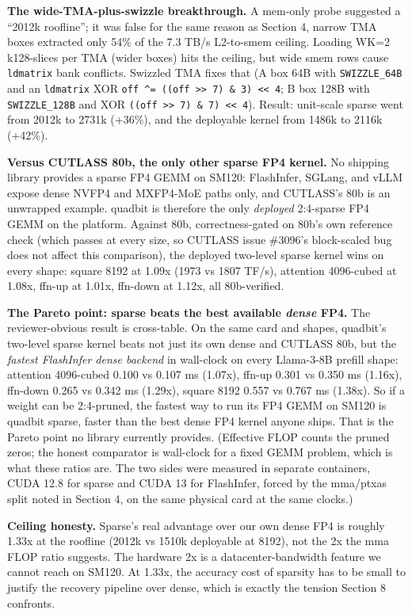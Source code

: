 \documentclass[
]{article}
\begin{document}
\textbf{The wide-TMA-plus-swizzle breakthrough.} A mem-only probe
suggested a ``2012k roofline''; it was false for the same reason as
Section 4, narrow TMA boxes extracted only 54\% of the 7.3 TB/s
L2-to-smem ceiling. Loading WK=2 k128-slices per TMA (wider boxes) hits
the ceiling, but wide smem rows cause \texttt{ldmatrix} bank conflicts.
Swizzled TMA fixes that (A box 64B with \texttt{SWIZZLE\_64B} and an
\texttt{ldmatrix} XOR
\texttt{off\ \^{}=\ ((off\ \textgreater{}\textgreater{}\ 7)\ \&\ 3)\ \textless{}\textless{}\ 4};
B box 128B with \texttt{SWIZZLE\_128B} and XOR
\texttt{((off\ \textgreater{}\textgreater{}\ 7)\ \&\ 7)\ \textless{}\textless{}\ 4}).
Result: unit-scale sparse went from 2012k to 2731k (+36\%), and the
deployable kernel from 1486k to 2116k (+42\%).

\textbf{Versus CUTLASS 80b, the only other sparse FP4 kernel.} No
shipping library provides a sparse FP4 GEMM on SM120: FlashInfer,
SGLang, and vLLM expose dense NVFP4 and MXFP4-MoE paths only, and
CUTLASS's 80b is an unwrapped example. quadbit is therefore the only
\emph{deployed} 2:4-sparse FP4 GEMM on the platform. Against 80b,
correctness-gated on 80b's own reference check (which passes at every
size, so CUTLASS issue \#3096's block-scaled bug does not affect this
comparison), the deployed two-level sparse kernel wins on every shape:
square 8192 at 1.09x (1973 vs 1807 TF/s), attention 4096-cubed at 1.08x,
ffn-up at 1.01x, ffn-down at 1.12x, all 80b-verified.

\textbf{The Pareto point: sparse beats the best available \emph{dense}
FP4.} The reviewer-obvious result is cross-table. On the same card and
shapes, quadbit's two-level sparse kernel beats not just its own dense
and CUTLASS 80b, but the \emph{fastest FlashInfer dense backend} in
wall-clock on every Llama-3-8B prefill shape: attention 4096-cubed 0.100
vs 0.107 ms (1.07x), ffn-up 0.301 vs 0.350 ms (1.16x), ffn-down 0.265 vs
0.342 ms (1.29x), square 8192 0.557 vs 0.767 ms (1.38x). So if a weight
can be 2:4-pruned, the fastest way to run its FP4 GEMM on SM120 is
quadbit sparse, faster than the best dense FP4 kernel anyone ships. That
is the Pareto point no library currently provides. (Effective FLOP
counts the pruned zeros; the honest comparator is wall-clock for a fixed
GEMM problem, which is what these ratios are. The two sides were
measured in separate containers, CUDA 12.8 for sparse and CUDA 13 for
FlashInfer, forced by the mma/ptxas split noted in Section 4, on the
same physical card at the same clocks.)

\textbf{Ceiling honesty.} Sparse's real advantage over our own dense FP4
is roughly 1.33x at the roofline (2012k vs 1510k deployable at 8192),
not the 2x the mma FLOP ratio suggests. The hardware 2x is a
datacenter-bandwidth feature we cannot reach on SM120. At 1.33x, the
accuracy cost of sparsity has to be small to justify the recovery
pipeline over dense, which is exactly the tension Section 8 confronts.
\end{document}

